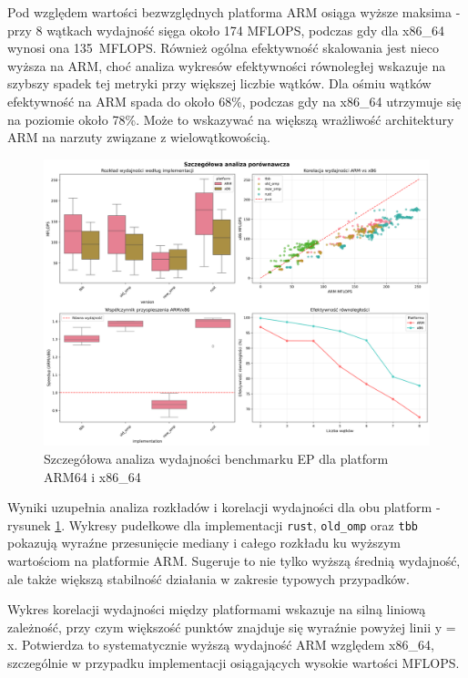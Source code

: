 Pod względem wartości bezwzględnych platforma ARM osiąga wyższe maksima - przy 8 wątkach wydajność sięga około 174 MFLOPS, podczas gdy dla x86\_64 wynosi ona \mbox{135 MFLOPS}. Również ogólna efektywność skalowania jest nieco wyższa na ARM, choć analiza wykresów efektywności równoległej wskazuje na szybszy spadek tej metryki przy większej liczbie wątków. Dla ośmiu wątków efektywność na ARM spada do około 68\%, podczas gdy na x86\_64 utrzymuje się na poziomie około 78\%. Może to wskazywać na większą wrażliwość architektury ARM na narzuty związane z wielowątkowością.
\begin{figure}[H]
    \centering
    \includegraphics[width=\textwidth]{analiza/images/parallel/ep/compare/ep_szczegolowa_analiza_wydajnosci.png}
    \caption{Szczegółowa analiza wydajności benchmarku EP dla platform ARM64 i x86\_64}
    \label{ep_szczegolowa_analiza_wydajnosci}
\end{figure}

Wyniki uzupełnia analiza rozkładów i korelacji wydajności dla obu platform - rysunek \ref{ep_szczegolowa_analiza_wydajnosci}. Wykresy pudełkowe dla implementacji \texttt{rust}, \texttt{old\_omp} oraz \texttt{tbb} pokazują wyraźne przesunięcie mediany i całego rozkładu ku wyższym wartościom na platformie ARM. Sugeruje to nie tylko wyższą średnią wydajność, ale także większą stabilność działania w zakresie typowych przypadków.

Wykres korelacji wydajności między platformami wskazuje na silną liniową zależność, przy czym większość punktów znajduje się wyraźnie powyżej linii y = x. Potwierdza to systematycznie wyższą wydajność ARM względem x86\_64, szczególnie w przypadku implementacji osiągających wysokie wartości MFLOPS.

